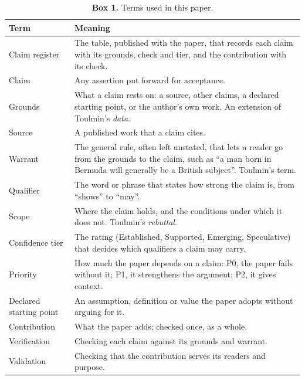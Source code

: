 \documentclass[12pt, a4paper]{article}
\begin{document}
\begin{table}[htbp]
\centering
\caption*{\textbf{Box 1.} Terms used in this paper.}
\footnotesize
\begin{tabular}{@{}p{3.6cm}p{11.2cm}@{}}
\toprule
\textbf{Term} & \textbf{Meaning} \\
\midrule
Claim register & The table, published with the paper, that records each claim with its grounds, check and tier, and the contribution with its check. \\
Claim & Any assertion put forward for acceptance. \\
Grounds & What a claim rests on: a source, other claims, a declared starting point, or the author's own work.  An extension of Toulmin's \emph{data}. \\
Source & A published work that a claim cites. \\
Warrant & The general rule, often left unstated, that lets a reader go from the grounds to the claim, such as ``a man born in Bermuda will generally be a British subject''.  Toulmin's term. \\
Qualifier & The word or phrase that states how strong the claim is, from ``shows'' to ``may''. \\
Scope & Where the claim holds, and the conditions under which it does not.  Toulmin's \emph{rebuttal}. \\
Confidence tier & The rating (Established, Supported, Emerging, Speculative) that decides which qualifiers a claim may carry. \\
Priority & How much the paper depends on a claim: P0, the paper fails without it; P1, it strengthens the argument; P2, it gives context. \\
Declared starting point & An assumption, definition or value the paper adopts without arguing for it. \\
Contribution & What the paper adds; checked once, as a whole. \\
Verification & Checking each claim against its grounds and warrant. \\
Validation & Checking that the contribution serves its readers and purpose. \\
\bottomrule
\end{tabular}
\end{table}
\end{document}
